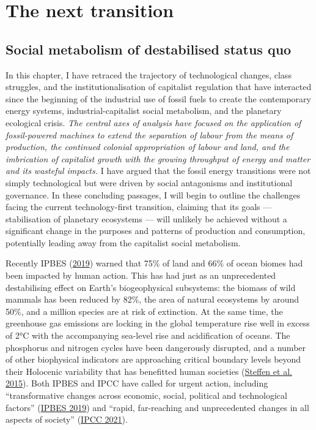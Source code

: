 \documentclass[a4paper, nobind]{templates/ociamthesis}
\begin{document}
\hypertarget{the-next-transition}{%
\section{The next transition}\label{the-next-transition}}

\hypertarget{social-metabolism-of-destabilised-status-quo}{%
\subsection{Social metabolism of destabilised status quo}\label{social-metabolism-of-destabilised-status-quo}}

In this chapter, I have retraced the trajectory of technological changes, class struggles, and the institutionalisation of capitalist regulation that have interacted since the beginning of the industrial use of fossil fuels to create the contemporary energy systems, industrial-capitalist social metabolism, and the planetary ecological crisis. \emph{The central axes of analysis have focused on the application of fossil-powered machines to extend the separation of labour from the means of production, the continued colonial appropriation of labour and land, and the imbrication of capitalist growth with the growing throughput of energy and matter and its wasteful impacts.} I have argued that the fossil energy transitions were not simply technological but were driven by social antagonisms and institutional governance. In these concluding passages, I will begin to outline the challenges facing the current technology-first transition, claiming that its goals --- stabilisation of planetary ecosystems --- will unlikely be achieved without a significant change in the purposes and patterns of production and consumption, potentially leading away from the capitalist social metabolism.

Recently IPBES (\protect\hyperlink{ref-ipbes_global_2019}{2019}) warned that 75\% of land and 66\% of ocean biomes had been impacted by human action. This has had just as an unprecedented destabilising effect on Earth's biogeophysical subsystems: the biomass of wild mammals has been reduced by 82\%, the area of natural ecosystems by around 50\%, and a million species are at risk of extinction. At the same time, the greenhouse gas emissions are locking in the global temperature rise well in excess of 2°C with the accompanying sea-level rise and acidification of oceans. The phosphorus and nitrogen cycles have been dangerously disrupted, and a number of other biophysical indicators are approaching critical boundary levels beyond their Holocenic variability that has benefitted human societies (\protect\hyperlink{ref-steffen_planetary_2015}{Steffen et al. 2015}). Both IPBES and IPCC have called for urgent action, including ``transformative changes across economic, social, political and technological factors'' (\protect\hyperlink{ref-ipbes_global_2019}{IPBES 2019}) and ``rapid, far-reaching and unprecedented changes in all aspects of society'' (\protect\hyperlink{ref-ipcc_summary_2021}{IPCC 2021}).
\end{document}
